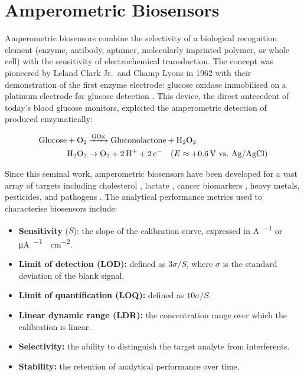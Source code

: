 \section{Amperometric Biosensors}
\label{sec:biosensors}

Amperometric biosensors combine the selectivity of a biological recognition element (enzyme, antibody, aptamer, molecularly imprinted polymer, or whole cell) with the sensitivity of electrochemical transduction. The concept was pioneered by Leland Clark Jr.\ and Champ Lyons in 1962 with their demonstration of the first enzyme electrode: glucose oxidase immobilised on a platinum electrode for glucose detection \cite{Clark1962}. This device, the direct antecedent of today's blood glucose monitors, exploited the amperometric detection of  produced enzymatically:

\begin{align}
    \text{Glucose} + \ce{O2} &\xrightarrow{\text{GOx}} \text{Gluconolactone} + \ce{H2O2} \\
    \ce{H2O2} &\rightarrow \ce{O2} + 2\,\ce{H+} + 2\,e^- \quad (E \approx +0.6\,\text{V vs.\ Ag/AgCl})
\end{align}

Since this seminal work, amperometric biosensors have been developed for a vast array of targets including cholesterol \cite{Pundir2013}, lactate \cite{Nikolaus2008}, cancer biomarkers \cite{Chandra2013}, heavy metals, pesticides, and pathogens \cite{Turner2013}. The analytical performance metrics used to characterise biosensors include:

\begin{itemize}
    \item \textbf{Sensitivity} ($S$): the slope of the calibration curve, expressed in \si{\ampere\per\molar} or \si{\micro\ampere\per\milli\molar\per\centi\metre\squared}.
    \item \textbf{Limit of detection (LOD):} defined as $3\sigma/S$, where $\sigma$ is the standard deviation of the blank signal.
    \item \textbf{Limit of quantification (LOQ):} defined as $10\sigma/S$.
    \item \textbf{Linear dynamic range (LDR):} the concentration range over which the calibration is linear.
    \item \textbf{Selectivity:} the ability to distinguish the target analyte from interferents.
    \item \textbf{Stability:} the retention of analytical performance over time.
\end{itemize}

